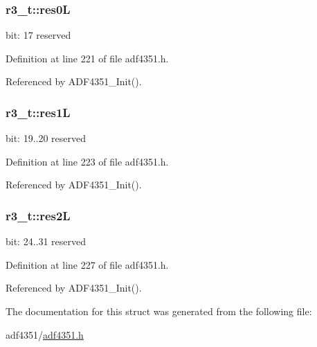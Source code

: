 \subsubsection[{\texorpdfstring{res0L}{res0L}}]{ r3\+\_\+t\+::res0L}\hypertarget{structr3__t_aa10065b1b2c2aed70a9e4427e76db29a}{}\label{structr3__t_aa10065b1b2c2aed70a9e4427e76db29a}
bit\+: 17 reserved 

Definition at line 221 of file adf4351.\+h.



Referenced by A\+D\+F4351\+\_\+\+Init().

\subsubsection[{\texorpdfstring{res1L}{res1L}}]{ r3\+\_\+t\+::res1L}\hypertarget{structr3__t_ab655f5b258ae1446791fbe557680daa6}{}\label{structr3__t_ab655f5b258ae1446791fbe557680daa6}
bit\+: 19..20 reserved 

Definition at line 223 of file adf4351.\+h.



Referenced by A\+D\+F4351\+\_\+\+Init().

\subsubsection[{\texorpdfstring{res2L}{res2L}}]{ r3\+\_\+t\+::res2L}\hypertarget{structr3__t_a2a1f40b19f451868336ca6558f653f1d}{}\label{structr3__t_a2a1f40b19f451868336ca6558f653f1d}
bit\+: 24..31 reserved 

Definition at line 227 of file adf4351.\+h.



Referenced by A\+D\+F4351\+\_\+\+Init().



The documentation for this struct was generated from the following file\+:\begin{DoxyCompactItemize}
\item 
adf4351/\hyperlink{adf4351_8h}{adf4351.\+h}\end{DoxyCompactItemize}
